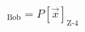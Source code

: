 \documentclass[preview]{standalone}
\begin{document}
\begin{align*}
[\vec{x}]_{\text{Bob}} = P [\vec{x}]_{\text{Z-4}}
\end{align*}
\end{document}
